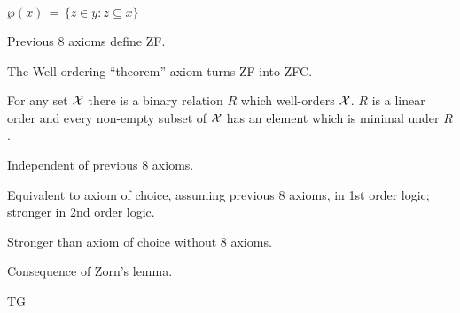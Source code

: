 ${\displaystyle {\wp}(x) \,=\, \{z\in y:z\subseteq x\}}$

\label{sec:Well_ordering_theorem}

Previous 8 axioms define \textsf{ZF}.

The Well-ordering ``theorem'' axiom turns \textsf{ZF}
into \textsf{ZFC}\cite{wiki:Well_ordering_theorem}.

For any set $\mathcal{X}$ there is a binary relation $R$ which
 well-orders $\mathcal{X}$.
 $R$ is a linear order and every non-empty subset of $\mathcal{X}$
 has an element which is minimal under $R$.

Independent of previous 8 axioms.

Equivalent to axiom of choice\cite{wiki:Axiom_of_choice}, 
assuming previous 8 axioms, in 1st order logic;
stronger in 2nd order logic.

Stronger than axiom of choice without 8 axioms.

Consequence of Zorn's lemma\cite{wiki:Zorns_lemma}.

\textsf{TG}


\setcounter{currentlevel}{\value{baseSectionLevel}}


\setcounter{currentlevel}{\value{baseSectionLevel}}




